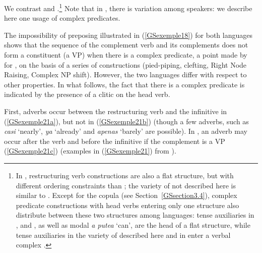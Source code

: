 We contrast  and .\footnote{In , restructuring verb
  constructions are also a flat structure, but with different ordering constraints than
  ; the variety of  not described here is similar to
  . Except for the copula (see Section~\ref{GSsection3.4}), complex predicate
  constructions with head verbs entering only one structure also distribute between these two
  structures among  languages: tense auxiliaries in ,  and
  , as well as  modal \emph{a putea} `can', are the head of a flat
  structure, while tense auxiliaries in the variety of  described here and in
   enter a verbal complex \citep{AG2010}.} Note that in , there is
variation among speakers: we describe here one usage of  complex predicates.  

The impossibility of preposing illustrated in (\ref{GSexemple18}) for both languages shows that the
sequence of the complement verb and its complements does not form a constituent (a VP) when there is
a complex predicate, a point made by \citet{rizzi1982issues} for , on the basis of a
series of constructions (pied-piping, clefting, Right Node Raising, Complex NP shift). However, the
two languages differ with respect to other properties. In what follows, the fact that there is a
complex predicate is indicated by the presence of a clitic on the head verb.
 
First, adverbs occur between the restructuring verb and the infinitive in 
(\ref{GSexemple21a}), but not in  (\ref{GSexemple21b}) (though a few adverbs, such as
\emph{casi} `nearly', \emph{ya} `already' and \emph{apenas} `barely' are possible). In
, an adverb may occur after the verb and before the infinitive if the complement is a
VP (\ref{GSexemple21c}) (examples in (\ref{GSexemple21}) from \citealt[139]{AG2010}).

\eal
	\label{GSexemple21} 
	\label{GSexemple21a}

	\label{GSexemple21b}		
	
